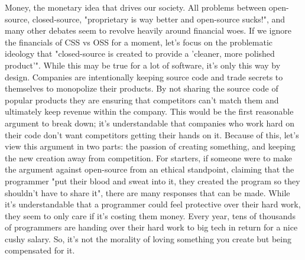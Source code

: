\documentclass[11pt]{article}
\begin{document}
Money, the monetary idea that drives our society. All problems between open-source, closed-source, "proprietary is way better and open-source sucks!", and many other debates seem to revolve heavily around financial woes. If we ignore the financials of CSS vs OSS for a moment, let's focus on the problematic ideology that "closed-source is created to provide a 'cleaner, more polished product'". While this may be true for a lot of software, it's only this way by design. Companies are intentionally keeping source code and trade secrets to themselves to monopolize their products. By not sharing the source code of popular products they are ensuring that competitors can't match them and ultimately keep revenue within the company. This would be the first reasonable argument to break down; it's understandable that companies who work hard on their code don't want competitors getting their hands on it. Because of this, let's view this argument in two parts: the passion of creating something, and keeping the new creation away from competition. For starters, if someone were to make the argument against open-source from an ethical standpoint, claiming that the programmer "put their blood and sweat into it, they created the program so they shouldn't have to share it", there are many responses that can be made. While it's understandable that a programmer could feel protective over their hard work, they seem to only care if it's costing them money. Every year, tens of thousands of programmers are handing over their hard work to big tech in return for a nice cushy salary. So, it's not the morality of loving something you create but being compensated for it. 
\end{document}
